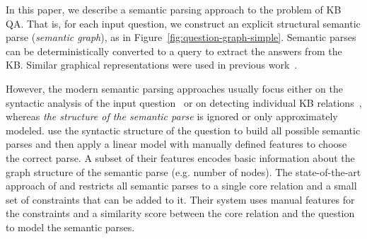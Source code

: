 \documentclass[11pt]{article}
\begin{document}
In this paper, we describe a semantic parsing approach to the problem of KB QA. That is, for each input question, we construct an explicit structural semantic parse (\textit{semantic graph}), as in Figure~\ref{fig:question-graph-simple}. Semantic parses can be deterministically converted to a query to extract the answers from the KB. Similar graphical representations were used in previous work~\cite{Yih2015,Reddy2016,Bao2016}.

However, the modern semantic parsing approaches usually focus either on the syntactic analysis of the input question~\cite{Reddy2016} or on detecting individual KB relations~\cite{Yu2017}, whereas \textit{the structure of the semantic parse} is ignored or only approximately modeled.  use the syntactic structure of the question to build all possible semantic parses and then apply a linear model with manually defined features to choose the correct parse. A subset of their features encodes basic information about the graph structure of the semantic parse (e.g. number of nodes). The state-of-the-art approach of  and  restricts all semantic parses to a single core relation and a small set of constraints that can be added to it. Their system uses manual features for the constraints and a similarity score between the core relation and the question to model the semantic parses.
\end{document}
